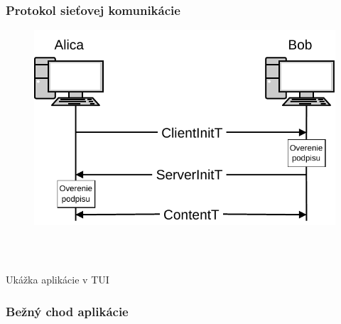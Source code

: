 \documentclass[%
  14pt,       				%
	t,                  %
	aspectratio=1610,   %
	unicode,						%
]{beamer}				    	%
\begin{document}
\begin{frame}[c]
	\frametitle{Protokol sieťovej komunikácie}
	\begin{figure}
		\includegraphics[width=.8\textwidth]{presentation_pictures/comm.pdf}
	\end{figure}
\end{frame}


\begin{frame}[c]
	\frametitle{\mbox{ }}
	\begin{center}
		{\Huge Ukážka aplikácie v TUI}
	\end{center}
\end{frame}

\begin{frame}[c]
	\frametitle{Bežný chod aplikácie}
\end{frame}
\end{document}
